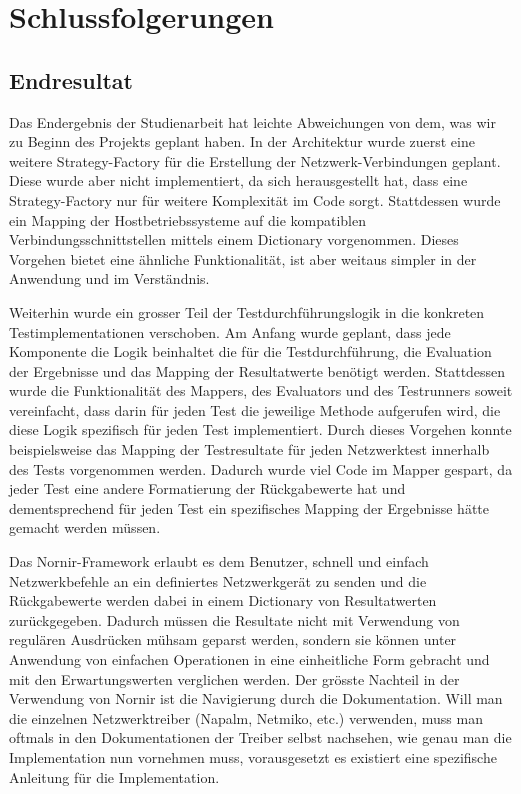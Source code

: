 \documentclass[]{subfiles}
\begin{document}
\section{Schlussfolgerungen}
\subsection{Endresultat}
Das Endergebnis der Studienarbeit hat leichte Abweichungen von dem, was wir zu Beginn
des Projekts geplant haben. 
In der Architektur wurde zuerst eine weitere Strategy-Factory für die Erstellung 
der Netzwerk-Verbindungen geplant. Diese wurde aber nicht implementiert, da 
sich herausgestellt hat, dass eine Strategy-Factory nur für weitere Komplexität 
im Code sorgt. 
Stattdessen wurde ein Mapping der Hostbetriebssysteme auf die 
kompatiblen Verbindungsschnittstellen mittels einem Dictionary vorgenommen.
Dieses Vorgehen bietet eine ähnliche Funktionalität, ist aber weitaus simpler 
in der Anwendung und im Verständnis.

Weiterhin wurde ein grosser Teil der Testdurchführungslogik in die konkreten Testimplementationen
verschoben. 
Am Anfang wurde geplant, dass jede Komponente die Logik beinhaltet die für die Testdurchführung,
die Evaluation der Ergebnisse und das Mapping der Resultatwerte benötigt werden.
Stattdessen wurde die Funktionalität des Mappers, des Evaluators und des Testrunners soweit 
vereinfacht, dass darin für jeden Test die jeweilige Methode aufgerufen wird, die diese
Logik spezifisch für jeden Test implementiert.
Durch dieses Vorgehen konnte beispielsweise das Mapping der Testresultate für jeden 
Netzwerktest innerhalb des Tests vorgenommen werden. 
Dadurch wurde viel Code im Mapper gespart, da jeder Test eine andere Formatierung der 
Rückgabewerte hat und dementsprechend für jeden Test ein spezifisches Mapping der Ergebnisse
hätte gemacht werden müssen.

Das Nornir-Framework erlaubt es dem Benutzer, schnell und einfach Netzwerkbefehle an ein
definiertes Netzwerkgerät zu senden und die Rückgabewerte werden dabei in einem 
Dictionary von Resultatwerten zurückgegeben. 
Dadurch müssen die Resultate nicht mit Verwendung von regulären Ausdrücken mühsam 
geparst werden, sondern sie können unter Anwendung von einfachen Operationen 
in eine einheitliche Form gebracht und mit den Erwartungswerten verglichen werden.
Der grösste Nachteil in der Verwendung von Nornir ist die Navigierung durch die Dokumentation.
Will man die einzelnen Netzwerktreiber (Napalm, Netmiko, etc.) verwenden, muss man 
oftmals in den Dokumentationen der Treiber selbst nachsehen, wie genau man die
Implementation nun vornehmen muss, vorausgesetzt es existiert eine spezifische Anleitung
für die Implementation. 
\end{document}
